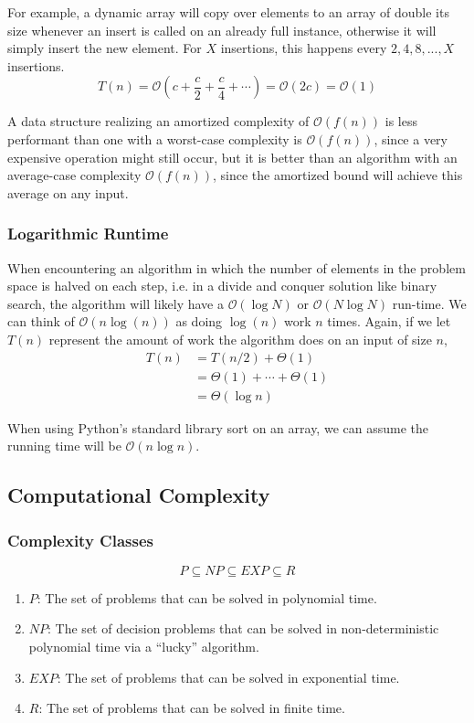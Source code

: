 \documentclass{article}
\newcommand{\bigO}{\ensuremath{\mathcal{O}}}
\begin{document}
For example, a dynamic array will copy over elements to an array of double its size whenever an insert is called on an already full instance, otherwise it will simply insert the new element. For $X$ insertions, this happens every $2, 4, 8, ..., X$ insertions.
\[
    T(n) = \bigO ( c + \frac{c}{2} + \frac{c}{4} + \cdots) 
    = \bigO(2c) 
    = \bigO(1)
\]

A data structure realizing an amortized complexity of $\bigO (f(n))$ is less performant than one with a worst-case complexity is $\bigO(f(n))$, since a very expensive operation might still occur, but it is better than an algorithm with an average-case complexity $\bigO(f(n))$, since the amortized bound will achieve this average on any input.

\subsubsection{Logarithmic Runtime}
When encountering an algorithm in which the number of elements in the problem space is halved on each step, i.e. in a divide and conquer solution like binary search, the algorithm will likely have a $\bigO(\log N)$ or $\bigO(N \log N)$ run-time. We can think of $\bigO(n \log(n))$ as doing $\log(n)$ work $n$ times. Again, if we let $T(n)$ represent the amount of work the algorithm does on an input of size $n$,
\begin{align*}
    T(n) &= T(n/2) + \Theta(1) \\
    &= \Theta(1) + \cdots + \Theta(1) \\
    &= \Theta(\log n ) 
\end{align*}

When using Python's standard library sort on an array, we can assume the running time will be $\bigO (n \log n)$.

\subsection{Computational Complexity}
\subsubsection{Complexity Classes}
\[
    P \subseteq NP \subseteq EXP \subseteq R
\]

\begin{enumerate}
    \item $P$:  The set of problems that can be solved in polynomial time.
    \item $NP$:  The set of decision problems that can be solved in non-deterministic polynomial time via a ``lucky'' algorithm.
    \item $EXP$: The set of problems that can be solved in exponential time. 
    \item $R$: The set of problems that can be solved in finite time.
\end{enumerate}
\end{document}

